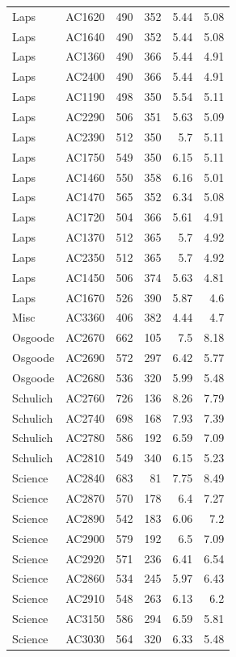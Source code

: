 \documentclass[article,10pt,microtype]{article}
\begin{document}
\begin{longtable}{llrrrr}
Laps & AC1620 & 490 & 352 & 5.44 & 5.08\\
Laps & AC1640 & 490 & 352 & 5.44 & 5.08\\
Laps & AC1360 & 490 & 366 & 5.44 & 4.91\\
Laps & AC2400 & 490 & 366 & 5.44 & 4.91\\
Laps & AC1190 & 498 & 350 & 5.54 & 5.11\\
Laps & AC2290 & 506 & 351 & 5.63 & 5.09\\
Laps & AC2390 & 512 & 350 & 5.7 & 5.11\\
Laps & AC1750 & 549 & 350 & 6.15 & 5.11\\
Laps & AC1460 & 550 & 358 & 6.16 & 5.01\\
Laps & AC1470 & 565 & 352 & 6.34 & 5.08\\
Laps & AC1720 & 504 & 366 & 5.61 & 4.91\\
Laps & AC1370 & 512 & 365 & 5.7 & 4.92\\
Laps & AC2350 & 512 & 365 & 5.7 & 4.92\\
Laps & AC1450 & 506 & 374 & 5.63 & 4.81\\
Laps & AC1670 & 526 & 390 & 5.87 & 4.6\\
Misc & AC3360 & 406 & 382 & 4.44 & 4.7\\
Osgoode & AC2670 & 662 & 105 & 7.5 & 8.18\\
Osgoode & AC2690 & 572 & 297 & 6.42 & 5.77\\
Osgoode & AC2680 & 536 & 320 & 5.99 & 5.48\\
Schulich & AC2760 & 726 & 136 & 8.26 & 7.79\\
Schulich & AC2740 & 698 & 168 & 7.93 & 7.39\\
Schulich & AC2780 & 586 & 192 & 6.59 & 7.09\\
Schulich & AC2810 & 549 & 340 & 6.15 & 5.23\\
Science & AC2840 & 683 & 81 & 7.75 & 8.49\\
Science & AC2870 & 570 & 178 & 6.4 & 7.27\\
Science & AC2890 & 542 & 183 & 6.06 & 7.2\\
Science & AC2900 & 579 & 192 & 6.5 & 7.09\\
Science & AC2920 & 571 & 236 & 6.41 & 6.54\\
Science & AC2860 & 534 & 245 & 5.97 & 6.43\\
Science & AC2910 & 548 & 263 & 6.13 & 6.2\\
Science & AC3150 & 586 & 294 & 6.59 & 5.81\\
Science & AC3030 & 564 & 320 & 6.33 & 5.48\\

\end{longtable}
\end{document}
